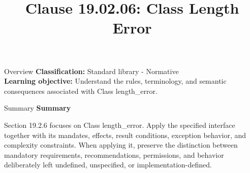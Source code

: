 \documentclass[10pt,letterpaper]{article}
\title{Clause 19.02.06: Class Length Error}
\author{}
\date{}
\begin{document}
\maketitle
\begin{CornellOverviewBox}{Overview}
\textbf{Classification:} Standard library - Normative\\[2pt]
\textbf{Learning objective:} Understand the rules, terminology, and semantic consequences associated with Class length\_error.
\end{CornellOverviewBox}\begin{CornellSummaryBox}{Summary}
{\sffamily\bfseries\color{Accent} Summary}\par\vspace{3pt}Section 19.2.6 focuses on Class length\_error. Apply the specified interface together with its mandates, effects, result conditions, exception behavior, and complexity constraints. When applying it, preserve the distinction between mandatory requirements, recommendations, permissions, and behavior deliberately left undefined, unspecified, or implementation-defined.
\end{CornellSummaryBox}
\end{document}
